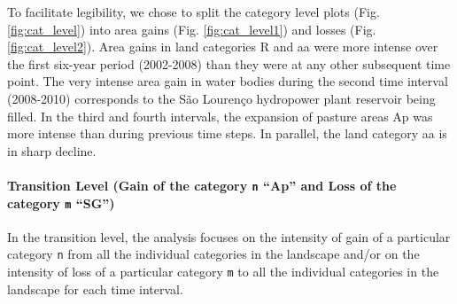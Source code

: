 To facilitate legibility, we chose to split the category level plots
(Fig. \ref{fig:cat_level}) into area gains (Fig. \ref{fig:cat_level1})
and losses (Fig. \ref{fig:cat_level2}). Area gains in land categories R
and aa were more intense over the first six-year period (2002-2008) than
they were at any other subsequent time point. The very intense area gain
in water bodies during the second time interval (2008-2010) corresponds
to the São Lourenço hydropower plant reservoir being filled. In the
third and fourth intervals, the expansion of pasture areas Ap was more
intense than during previous time steps. In parallel, the land category
aa is in sharp decline.

\hypertarget{transition-level-gain-of-the-category-n-ap-and-loss-of-the-category-m-sg}{%
\paragraph{\texorpdfstring{Transition Level (Gain of the category
\texttt{n} ``Ap'' and Loss of the category \texttt{m}
``SG'')}{Transition Level (Gain of the category n ``Ap'' and Loss of the category m ``SG'')}}\label{transition-level-gain-of-the-category-n-ap-and-loss-of-the-category-m-sg}}

In the transition level, the analysis focuses on the intensity of gain
of a particular category \texttt{n} from all the individual categories
in the landscape and/or on the intensity of loss of a particular
category \texttt{m} to all the individual categories in the landscape
for each time interval.


